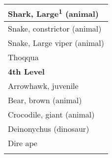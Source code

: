 \begin{longtable}{ll}
\hline
\multicolumn{2}{|p{3.857in}|}{\begin{minipage}[t]{3.857in}\raggedright
Shark, Large\textsuperscript{\textbf{1}}\textbf{} (animal)\end{minipage}}\\
\hline
\multicolumn{2}{|p{3.857in}|}{\begin{minipage}[t]{3.857in}\raggedright
Snake, constrictor (animal)\end{minipage}}\\
\hline
\multicolumn{2}{|p{3.857in}|}{\begin{minipage}[t]{3.857in}\raggedright
Snake, Large viper (animal)\end{minipage}}\\
\hline
\multicolumn{2}{|p{3.857in}|}{\begin{minipage}[t]{3.857in}\raggedright
Thoqqua\end{minipage}}\\
\hline
\multicolumn{2}{|p{3.857in}|}{\begin{minipage}[t]{3.857in}\raggedright
\textbf{4th Level}\end{minipage}}\\
\hline
\multicolumn{2}{|p{3.857in}|}{\begin{minipage}[t]{3.857in}\raggedright
Arrowhawk, juvenile\end{minipage}}\\
\hline
\multicolumn{2}{|p{3.857in}|}{\begin{minipage}[t]{3.857in}\raggedright
Bear, brown (animal)\end{minipage}}\\
\hline
\multicolumn{2}{|p{3.857in}|}{\begin{minipage}[t]{3.857in}\raggedright
Crocodile, giant (animal)\end{minipage}}\\
\hline
\multicolumn{2}{|p{3.857in}|}{\begin{minipage}[t]{3.857in}\raggedright
Deinonychus (dinosaur)\end{minipage}}\\
\hline
\multicolumn{2}{|p{3.857in}|}{\begin{minipage}[t]{3.857in}\raggedright
Dire ape\end{minipage}}\\
\hline
\multicolumn{2}{|p{3.857in}|}{\begin{minipage}[t]{3.857in}\raggedright

\end{minipage}}
\end{longtable}
